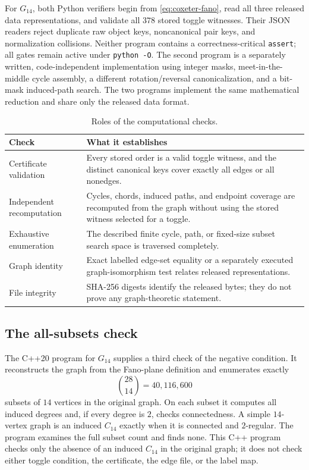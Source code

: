 \documentclass[11pt]{amsart}
\newcommand{\Ck}[1]{C_{#1}}
\newcommand{\Gfourteen}{G_{14}}
\theoremstyle{definition}
\theoremstyle{remark}
\begin{document}
For \(\Gfourteen\), both Python verifiers begin from
\cref{eq:coxeter-fano}, read all three released data representations, and
validate all \(378\) stored toggle witnesses.  Their JSON readers reject
duplicate raw object keys, noncanonical pair keys, and normalization
collisions.  Neither program contains a correctness-critical
\texttt{assert}; all gates remain active under \texttt{python -O}.  The
second program is a separately written, code-independent implementation
using integer masks, meet-in-the-middle cycle assembly, a different
rotation/reversal canonicalization, and a bit-mask induced-path search.  The
two programs implement the same mathematical reduction and share only the
released data format.

\begin{table}[H]
\centering
\caption{Roles of the computational checks.}
\label{tab:evidence}
\begin{tabular}{@{}L{0.25\textwidth}L{0.67\textwidth}@{}}
\toprule
Check & What it establishes \\
\midrule
Certificate validation &
Every stored order is a valid toggle witness, and the distinct canonical
keys cover exactly all edges or all nonedges. \\
\addlinespace
Independent recomputation &
Cycles, chords, induced paths, and endpoint coverage are recomputed from the
graph without using the stored witness selected for a toggle. \\
\addlinespace
Exhaustive enumeration &
The described finite cycle, path, or fixed-size subset search space is
traversed completely. \\
\addlinespace
Graph identity &
Exact labelled edge-set equality or a separately executed graph-isomorphism
test relates released representations. \\
\addlinespace
File integrity &
SHA-256 digests identify the released bytes; they do not prove any
graph-theoretic statement. \\
\bottomrule
\end{tabular}
\end{table}

\subsection{The all-subsets check}

The C++20 program for \(\Gfourteen\) supplies a third check of the negative
condition.  It reconstructs the graph from the Fano-plane definition and
enumerates exactly
\[
  \binom{28}{14}=40{,}116{,}600
\]
subsets of \(14\) vertices in the original graph.  On each subset it computes
all induced degrees and, if every degree is \(2\), checks connectedness.  A
simple \(14\)-vertex graph is an induced \(\Ck{14}\) exactly when it is
connected and \(2\)-regular.  The program examines the full subset count and
finds none.  This C++ program checks only the absence of an induced
\(\Ck{14}\) in the original graph; it does not check either toggle condition,
the certificate, the edge file, or the label map.
\end{document}
